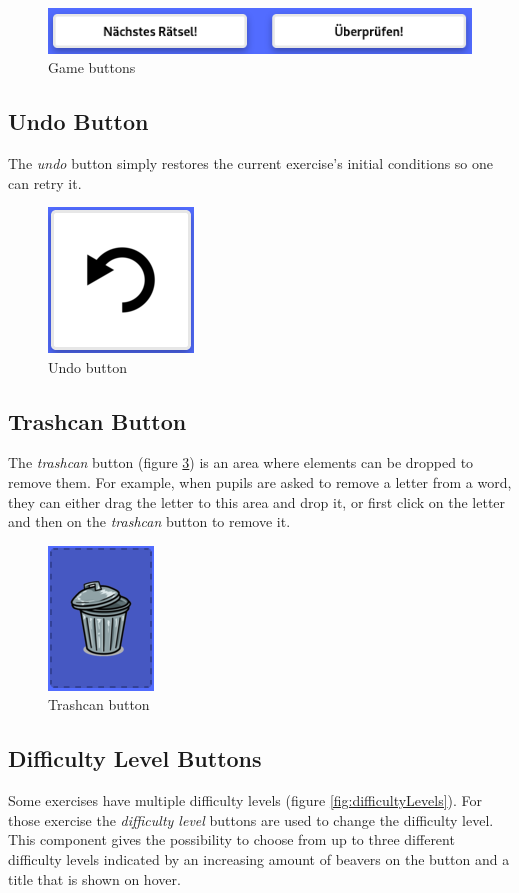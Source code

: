 \begin{figure}[h]
    \centering
    \includegraphics[width=0.5\columnwidth]{figures/game_buttons.png}
    \caption{Game buttons}
    \label{fig:gameButtons} 
\end{figure}

\subsection*{Undo Button}
The \textit{undo} button simply restores the current exercise's initial conditions so one can retry it.

\begin{figure}[h]
    \centering
    \includegraphics[width=0.1\columnwidth]{figures/undo.png}
    \caption{Undo button}
    \label{fig:undo} 
\end{figure}

\subsection*{Trashcan Button}
The \textit{trashcan} button (figure \ref{fig:trashcan}) is an area where elements can be dropped to remove them. For example, when pupils are asked to remove a letter from a word, they can either drag the letter to this area and drop it, or first click on the letter and then on the \textit{trashcan} button to remove it.

\begin{figure}[h]
    \centering
    \includegraphics[width=0.1\columnwidth]{figures/trashcan.png}
    \caption{Trashcan button}
    \label{fig:trashcan} 
\end{figure}

\subsection*{Difficulty Level Buttons}
Some exercises have multiple difficulty levels (figure \ref{fig:difficultyLevels}). For those exercise the \textit{difficulty level} buttons are used to change the difficulty level. This component gives the possibility to choose from up to three different difficulty levels indicated by an increasing amount of beavers on the button and a title that is shown on hover.

